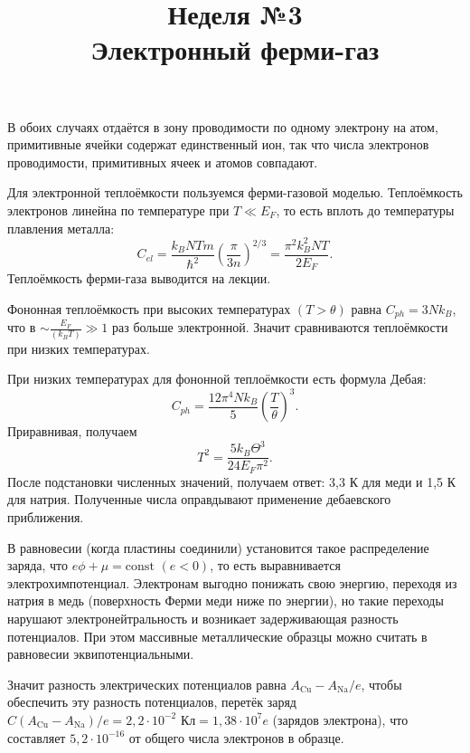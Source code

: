 \documentclass[a4paper]{article}
\title{Неделя №3\\
Электронный ферми-газ}
\begin{document}
	\maketitle
\begin{hiProb}[3.44]
\end{hiProb}
\begin{sol}
В обоих случаях отдаётся в зону проводимости
по одному электрону на атом, примитивные 
ячейки содержат единственный ион, так что
числа электронов проводимости, примитивных
ячеек и атомов совпадают.

Для электронной теплоёмкости пользуемся ферми-газовой
моделью. Теплоёмкость электронов линейна по температуре
при $T \ll E_F$, то есть вплоть до температуры
плавления металла:
\[
	C_{el}= \frac{k_B N T m}{\hbar ^2}
	\left( \frac{\pi}{3n} \right) ^{2 /3}=
	\frac{\pi^2 k_B ^2 NT}{2E_F}
.\] 
Теплоёмкость ферми-газа выводится на лекции.

Фононная теплоёмкость при высоких температурах $(T>\theta)$ равна $C_{ph}= 3 N k_B$, что в 
$\sim \frac{E_F}{(k_B T)}\gg 1$ раз больше
электронной. Значит сравниваются теплоёмкости
при низких температурах.

При низких температурах для фононной теплоёмкости
есть формула Дебая:
\[
	C_{ph}= \frac{12 \pi^4 N k_B}{5} \left( \frac{T}{\theta} \right) ^3
.\] 
Приравнивая, получаем
\[
T^2= \frac{5 k_B \Theta^3}{24 E_F \pi^2}
.\] 
После подстановки численных значений, получаем
ответ: 3,3 К для меди и 1,5 К для натрия.
Полученные числа оправдывают применение дебаевского
приближения.
\end{sol}
\begin{hiProb}[3.53]
\end{hiProb}
\begin{sol}
	В равновесии (когда пластины соединили)
	установится такое распределение заряда, что
	$e\phi +\mu = \mathrm{const}$ $(e<0)$,
	то есть выравнивается электрохимпотенциал.
	Электронам выгодно понижать свою энергию,
	переходя из натрия в медь (поверхность Ферми
	меди ниже по энергии), но такие переходы
	нарушают электронейтральность и
	возникает задерживающая разность
	потенциалов. При этом массивные металлические
	образцы можно считать в равновесии
	эквипотенциальными.

	Значит разность электрических потенциалов
	равна $A_{\mathrm{Cu}}-A_{\mathrm{Na}} /e$,
	чтобы обеспечить эту разность потенциалов,
	перетёк заряд $C(A_{\mathrm{Cu}}-A_{\operatorname{Na}}) /e=2,2 \cdot 10^{-2} \text{ Кл}=1,38
	\cdot 10^7 e$ (зарядов электрона),
	что составляет $5,2 \cdot 10^{-16}$ 
	от общего числа электронов в образце.
\end{sol}
\end{document}
